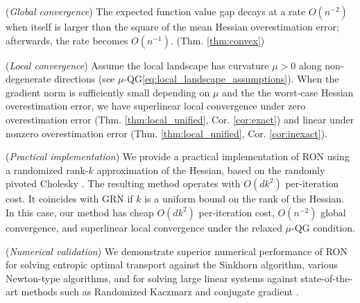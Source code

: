 \documentclass[11pt]{amsart}
\theoremstyle{plain}
\theoremstyle{definition}
\theoremstyle{remark}
\begin{document}
\begin{description}[style=unboxed,leftmargin=0.4cm]
    \item[$\bullet$] (\textit{Global convergence}) The expected function value gap decays at a rate $O(n^{-2})$ when itself is larger than the square of the mean Hessian overestimation error; afterwards, the rate becomes $O(n^{-1})$. (Thm. \ref{thm:convex})

    \item[$\bullet$] (\textit{Local convergence}) Assume the local landscape has curvature $\mu>0$ along non-degenerate directions (see $\mu$-{QG}\eqref{eq:local_landscape_assumptions}). When the gradient norm is sufficiently small depending on $\mu$ and the the worst-case Hessian overestimation error, we have superlinear local convergence under zero overestimation error (Thm. \ref{thm:local_unified}, Cor. \ref{cor:exact}) and linear under nonzero overestimation error (Thm. \ref{thm:local_unified}, Cor. \ref{cor:inexact}).

    \item[$\bullet$] (\textit{Practical implementation}) We provide a practical implementation of RON using a randomized rank-$k$ approximation of the Hessian, based on the randomly pivoted Cholesky \cite{chen2022randomly}. The resulting method operates with $O(dk^{2})$ per-iteration cost. It coincides with GRN \cite{mishchenko2023regularized} if $k$ is a uniform bound on the rank of the Hessian. In this case, our method has cheap $O(dk^{2})$ per-iteration cost, $O(n^{-2})$ global convergence, and superlinear local convergence under the relaxed $\mu$-{QG} condition. 

    \item[$\bullet$] (\textit{Numerical validation}) %
     We demonstrate superior numerical performance of RON for solving entropic optimal transport against the Sinkhorn algorithm, various Newton-type algorithms, and for solving large linear systems against state-of-the-art methods such as Randomized Kaczmarz \cite{strohmer2009randomized} and conjugate gradient \cite{hestenes1952methods}. 
\end{description}
\end{document}
